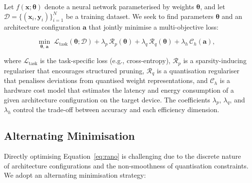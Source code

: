 \documentclass[12pt,a4paper,oneside]{book}
\begin{document}
Let $f(\mathbf{x}; \boldsymbol{\theta})$ denote a neural network
parameterised by weights $\boldsymbol{\theta}$, and let
$\mathcal{D} = \{(\mathbf{x}_i, \mathbf{y}_i)\}_{i=1}^{N}$ be a
training dataset. We seek to find parameters $\boldsymbol{\theta}$ and
an architecture configuration $\mathbf{a}$ that jointly minimise a
multi-objective loss:

\begin{equation}
\min_{\boldsymbol{\theta},\,\mathbf{a}} \;
\mathcal{L}_{\text{task}}(\boldsymbol{\theta}; \mathcal{D})
+ \lambda_p \, \mathcal{R}_p(\boldsymbol{\theta})
+ \lambda_q \, \mathcal{R}_q(\boldsymbol{\theta})
+ \lambda_h \, \mathcal{C}_h(\mathbf{a}),
\label{eq:rano}
\end{equation}

where $\mathcal{L}_{\text{task}}$ is the task-specific loss (e.g.,
cross-entropy), $\mathcal{R}_p$ is a sparsity-inducing regulariser that
encourages structured pruning, $\mathcal{R}_q$ is a quantisation
regulariser that penalises deviations from quantised weight
representations, and $\mathcal{C}_h$ is a hardware cost model that
estimates the latency and energy consumption of a given architecture
configuration on the target device. The coefficients $\lambda_p$,
$\lambda_q$, and $\lambda_h$ control the trade-off between accuracy and
each efficiency dimension.

\subsection{Alternating Minimisation}

Directly optimising Equation~\ref{eq:rano} is challenging due to the
discrete nature of architecture configurations and the non-smoothness of
quantisation constraints. We adopt an alternating minimisation strategy:
\end{document}
